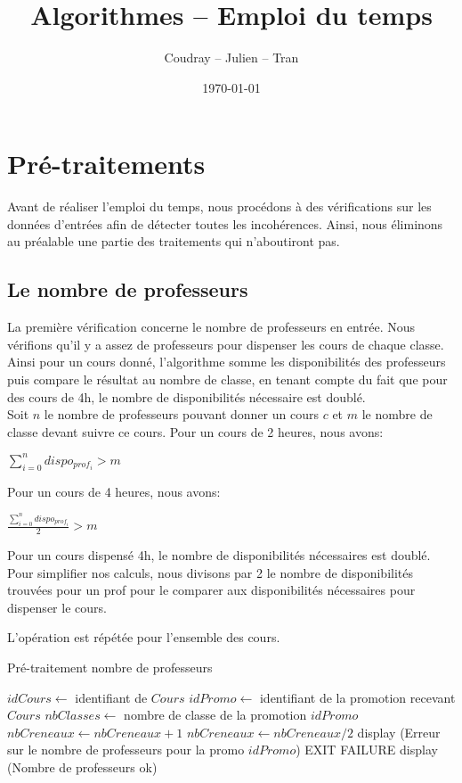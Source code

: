 \documentclass[12pt,a4paper,french]{article}
\begin{document}
\title{Algorithmes -- Emploi du temps}
\author{Coudray -- Julien -- Tran}
\date{\today}
\maketitle

\section{Pré-traitements}
Avant de réaliser l'emploi du temps, nous procédons à des vérifications sur les données d'entrées afin de détecter toutes les incohérences. Ainsi, nous éliminons au préalable une partie des traitements qui n'aboutiront pas.

\subsection{Le nombre de professeurs}
La première vérification concerne le nombre de professeurs en entrée. Nous vérifions qu'il y a assez de professeurs pour dispenser les cours de chaque classe.
Ainsi pour un cours donné, l'algorithme somme les disponibilités des professeurs puis compare le résultat au nombre de classe, en tenant compte du fait que pour des cours de 4h, le nombre de disponibilités nécessaire est doublé.\\

Soit $n$ le nombre de professeurs pouvant donner un cours $c$ et $m$ le nombre de classe devant suivre ce cours.
Pour un cours de 2 heures, nous avons:
\begin{center}
$\sum_{i=0}^n dispo_{prof_i} > m$
\end{center}

Pour un cours de 4 heures, nous avons: 
\begin{center}
$\frac{\sum_{i=0}^n dispo_{prof_i}}{2} > m$
\end{center}

Pour un cours dispensé 4h, le nombre de disponibilités nécessaires est doublé. Pour simplifier nos calculs, nous divisons par 2 le nombre de disponibilités trouvées pour un prof pour le comparer aux disponibilités nécessaires pour dispenser le cours.

L'opération est répétée pour l'ensemble des cours. 

\begin{algorithm}
\caption{Pré-traitement nombre de professeurs}
\begin{algorithmic}
\STATE $idCours \leftarrow$ identifiant de $Cours$
\STATE $idPromo \leftarrow$ identifiant de la promotion recevant $Cours$
\STATE $nbClasses \leftarrow$ nombre de classe de la promotion $idPromo$
\STATE $nbCreneaux \leftarrow nbCreneaux + 1$
\ENDIF
\ENDFOR
\ENDIF
\ENDFOR
{}
\STATE $nbCreneaux \leftarrow nbCreneaux / 2$
\ENDIF
{}
\STATE display (Erreur sur le nombre de professeurs pour la promo $idPromo$)
\STATE EXIT FAILURE
\ENDIF
\ENDFOR
\STATE display (Nombre de professeurs ok)
\end{algorithmic}
\end{algorithm}
\end{document}
